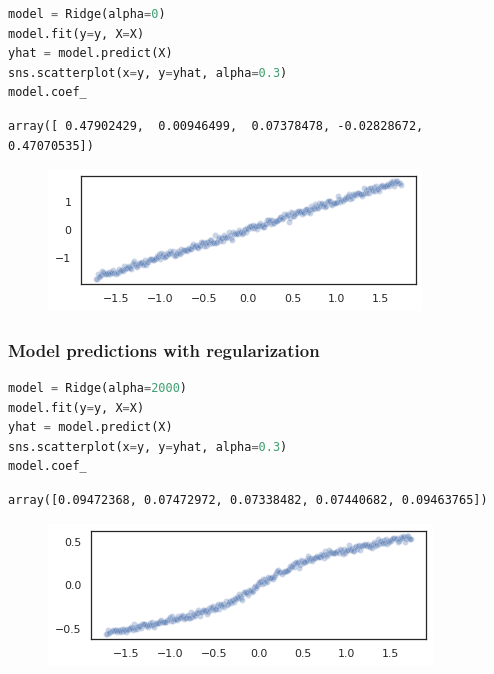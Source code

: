 \begin{lstlisting}[language=Python]
model = Ridge(alpha=0)
model.fit(y=y, X=X)
yhat = model.predict(X)
sns.scatterplot(x=y, y=yhat, alpha=0.3)
model.coef_
\end{lstlisting}

\begin{lstlisting}
array([ 0.47902429,  0.00946499,  0.07378478, -0.02828672,  0.47070535])
\end{lstlisting}

\begin{figure}[H]
\centering
\includegraphics[width=0.5\paperwidth]{fig/normality_and_linearity_violation_files/normality_and_linearity_violation_5_1.png}
\end{figure}

\hypertarget{model-predictions-with-regularization}{%
\subsubsection{\texorpdfstring{Model predictions \textbf{with}
regularization}{Model predictions with regularization}}\label{model-predictions-with-regularization}}

\begin{lstlisting}[language=Python]
model = Ridge(alpha=2000)
model.fit(y=y, X=X)
yhat = model.predict(X)
sns.scatterplot(x=y, y=yhat, alpha=0.3)
model.coef_

\end{lstlisting}

\begin{lstlisting}
array([0.09472368, 0.07472972, 0.07338482, 0.07440682, 0.09463765])
\end{lstlisting}

\begin{figure}[H]
\centering
\includegraphics[width=0.5\paperwidth]{fig/normality_and_linearity_violation_files/normality_and_linearity_violation_7_1.png}
\end{figure}
